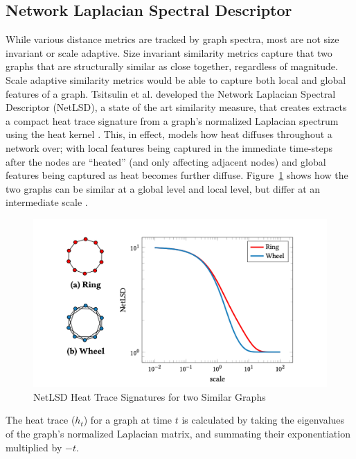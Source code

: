 \subsection{Network Laplacian Spectral Descriptor}\label{sec:NetLSD}

While various distance metrics are tracked by graph spectra, most are not size
invariant or scale adaptive. Size invariant similarity metrics capture that two
graphs that are structurally similar as close together, regardless of magnitude.
Scale adaptive similarity metrics would be able to capture both local and global
features of a graph. Tsitsulin et al. developed the Network Laplacian Spectral
Descriptor (NetLSD), a state of the art similarity measure, that creates
extracts a compact heat trace signature from a graph's normalized Laplacian
spectrum using the heat kernel \cite{netlsd}. This, in effect, models how heat
diffuses throughout a network over; with local features being captured in the
immediate time-steps after the nodes are ``heated'' (and only affecting adjacent
nodes) and global features being captured as heat becomes further diffuse.
Figure~\ref{fig:heat_trace_ex} shows how the two graphs can be similar at a
global level and local level, but differ at an intermediate scale \cite{netlsd}.

\begin{singlespacing}
    \begin{figure}[H]
    \centering
    \includegraphics[scale=0.25]{Figures/heat_trace_ex}
    \caption[NetLSD Heat Trace Signatures for two Similar Graphs \cite{netlsd}]{NetLSD Heat Trace Signatures for two Similar Graphs \cite{netlsd}}
    \label{fig:heat_trace_ex}
    \end{figure}
\end{singlespacing}

The heat trace ($h_{t}$) for a graph at time $t$ is calculated by taking the
eigenvalues of the graph's normalized Laplacian matrix, and summating their
exponentiation multiplied by $-t$. 

